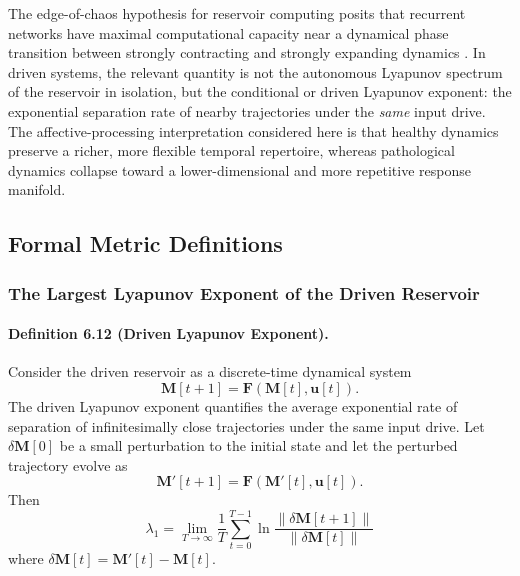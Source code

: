 The edge-of-chaos hypothesis for reservoir computing posits that recurrent networks have maximal computational capacity near a dynamical phase transition between strongly contracting and strongly expanding dynamics \cite{langton_computation_1990,bertschinger_real-time_2004}. In driven systems, the relevant quantity is not the autonomous Lyapunov spectrum of the reservoir in isolation, but the conditional or driven Lyapunov exponent: the exponential separation rate of nearby trajectories under the \emph{same} input drive. The affective-processing interpretation considered here is that healthy dynamics preserve a richer, more flexible temporal repertoire, whereas pathological dynamics collapse toward a lower-dimensional and more repetitive response manifold.

\subsection{Formal Metric Definitions}

\subsubsection{The Largest Lyapunov Exponent of the Driven Reservoir}

\paragraph{Definition 6.12 (Driven Lyapunov Exponent).}
Consider the driven reservoir as a discrete-time dynamical system
\begin{equation}
\mathbf{M}[t+1]=\mathbf{F}(\mathbf{M}[t],\mathbf{u}[t]).
\end{equation}
The driven Lyapunov exponent quantifies the average exponential rate of separation of infinitesimally close trajectories under the same input drive. Let $\delta \mathbf{M}[0]$ be a small perturbation to the initial state and let the perturbed trajectory evolve as
\begin{equation}
\mathbf{M}'[t+1]=\mathbf{F}(\mathbf{M}'[t],\mathbf{u}[t]).
\end{equation}
Then
\begin{equation}
\lambda_1 = \lim_{T\to\infty}\frac{1}{T}\sum_{t=0}^{T-1}\ln\frac{\lVert \delta \mathbf{M}[t+1]\rVert}{\lVert \delta \mathbf{M}[t]\rVert}
\end{equation}
where $\delta \mathbf{M}[t]=\mathbf{M}'[t]-\mathbf{M}[t]$.

